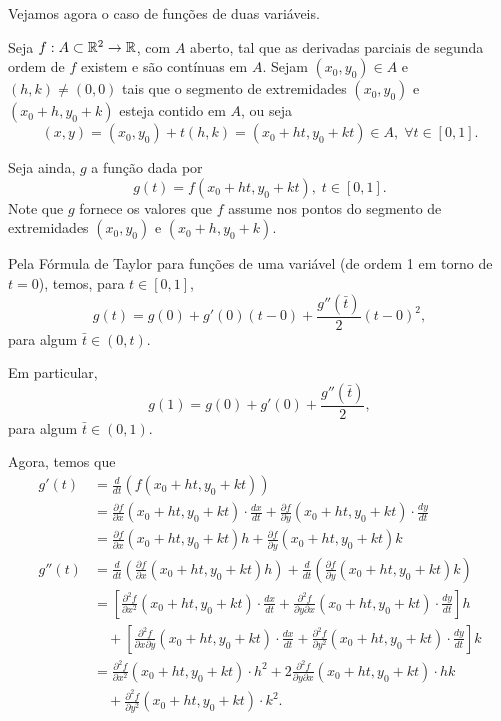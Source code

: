 Vejamos agora o caso de funções de duas variáveis.

Seja \(f: A\subset\mathbb{R}^2 \to \mathbb{R}\), com \(A\) aberto, tal que as derivadas parciais de segunda ordem de \(f\) existem e são contínuas em \(A\). Sejam \((x_0,y_0)\in A\) e \((h,k)\neq(0,0)\) tais que o segmento de extremidades \((x_0,y_0)\) e \((x_0+h,y_0+k)\) esteja contido em \(A\), ou seja \[(x,y) = (x_0,y_0) + t(h,k) = (x_0+ht,y_0+kt)\in A,\; \forall t\in[0,1].\]

Seja ainda, \(g\) a função dada por \[g(t) = f(x_0 + ht, y_0 + kt),\; t\in[0,1].\] Note que \(g\) fornece os valores que \(f\) assume nos pontos do segmento de extremidades \((x_0,y_0)\) e \((x_0+h,y_0+k)\).

Pela Fórmula de Taylor para funções de uma variável (de ordem 1 em torno de \(t = 0\)), temos, para \(t\in[0,1]\), \[g(t) = g(0) + g'(0)(t-0) + \frac{g''(\bar{t})}{2}(t-0)^2,\] para algum \(\bar{t} \in (0,t)\).

Em particular,
    \begin{equation}\label{eqn.g(1)}
        g(1) = g(0) + g'(0) + \frac{g''(\bar{t})}{2},
    \end{equation}
para algum \(\bar{t}\in(0,1)\).

Agora, temos que
    \begin{align*}
        g'(t)
            & = \frac{d}{dt}(f(x_0+ht,y_0+kt)) \\
            & = \frac{\partial f}{\partial x}(x_0+ht,y_0+kt)\cdot\frac{dx}{dt} + \frac{\partial f}{\partial y}(x_0+ht,y_0+kt)\cdot\frac{dy}{dt} \\
            & = \frac{\partial f}{\partial x}(x_0+ht,y_0+kt) h + \frac{\partial f}{\partial y}(x_0+ht,y_0+kt) k \\
        g''(t)
            & = \frac{d}{dt} \left( \frac{\partial f}{\partial x}(x_0+ht,y_0+kt) h \right) + \frac{d}{dt}\left( \frac{\partial f}{\partial y}(x_0+ht,y_0+kt) k \right) \\
            & = \left[ \frac{\partial^2 f}{\partial x^2}(x_0+ht,y_0+kt) \cdot \frac{dx}{dt} + \frac{\partial^2 f}{\partial y \partial x}(x_0+ht,y_0+kt)\cdot\frac{dy}{dt} \right] h \\
                & \quad + \left[ \frac{\partial^2 f}{\partial x \partial y}(x_0+ht,y_0+kt)\cdot\frac{dx}{dt} + \frac{\partial^2 f}{\partial y^2}(x_0+ht,y_0+kt) \cdot \frac{dy}{dt} \right] k \\
            & = \frac{\partial^2 f}{\partial x^2}(x_0+ht,y_0+kt) \cdot h^2 + 2 \frac{\partial^2 f}{\partial y \partial x}(x_0+ht,y_0+kt)\cdot hk \\
                & \quad + \frac{\partial^2 f}{\partial y^2}(x_0+ht,y_0+kt) \cdot k^2.
    \end{align*}

